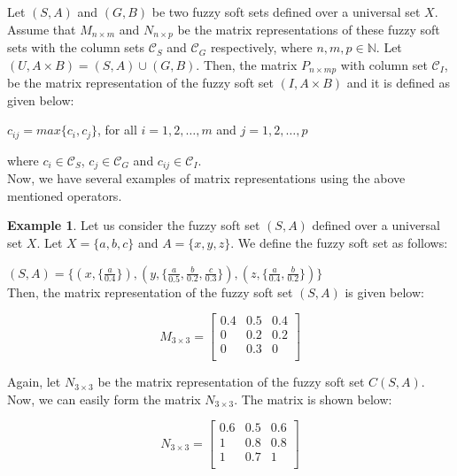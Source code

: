 \documentclass{article}
\theoremstyle{definition}
\newtheorem{example}{Example}[section]
\begin{document}
  Let $(S,A)$ and $(G,B)$ be two fuzzy soft sets defined over a universal set $X$. Assume that $M_{n\times m}$ and $N_{n\times p}$ be the matrix representations of these fuzzy soft sets with the column sets ${\mathcal{C}}_S$ and ${\mathcal{C}}_G$ respectively, where $n, m, p \in \mathbb{N}$. Let $(U, A\times B)=(S,A) \cup (G,B)$. Then, the matrix $P_{n\times mp}$ with column set ${\mathcal{C}}_I$, be the matrix representation of the fuzzy soft set $(I,A\times B)$ and it is defined as given below: 
  \begin{center}
      $c_{ij}=max\{c_i, c_j\}$, for all $i=1, 2, \dots, m$ and $j=1, 2, \dots, p$
  \end{center}
where $c_i \in {\mathcal{C}}_S$, $c_j \in {\mathcal{C}}_G$ and $c_{ij} \in {\mathcal{C}}_I$.\\

Now, we have several examples of matrix representations using the above mentioned operators.

  \begin{example}
      Let us consider the fuzzy soft set $(S,A)$ defined over a universal set $X$. Let $X=\{a, b, c\}$ and $A=\{x, y, z\}$. We define the fuzzy soft set as follows:
      
      $(S,A)=\{(x, \{\frac{a}{0.4}\}), (y, \{\frac{a}{0.5}, \frac{b}{0.2}, \frac{c}{0.3}\}), (z,\{\frac{a}{0.4}, \frac{b}{0.2}\})\}$\\

      Then, the matrix representation of the fuzzy soft set $(S,A)$ is given below:
\begin{center}
    \[
    M_{3\times3}=
    \begin{bmatrix}
        0.4 & 0.5 & 0.4 \\
          0 & 0.2 & 0.2 \\
           0 & 0.3 & 0 \\
     \end{bmatrix}
     \]
\end{center}
Again, let $N_{3\times 3}$ be the matrix representation of the fuzzy soft set $C(S,A)$. Now, we can easily form the matrix $N_{3\times 3}$. The matrix is shown below: 
\begin{center}
    \[
    N_{3\times 3}=
    \begin{bmatrix}
        0.6 & 0.5 & 0.6 \\
          1 & 0.8 & 0.8 \\
           1 & 0.7 & 1 \\
     \end{bmatrix}
     \]
\end{center}
  \end{example}
\end{document}
